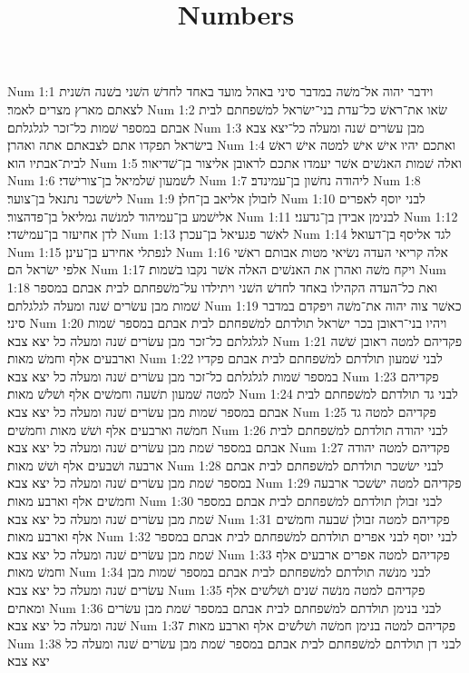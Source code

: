 

\title{Numbers}

Num 1:1  וידבר יהוה אל־משׁה במדבר סיני באהל מועד באחד לחדשׁ השׁני בשׁנה השׁנית לצאתם מארץ מצרים לאמר׃
Num 1:2  שׂאו את־ראשׁ כל־עדת בני־ישׂראל למשׁפחתם לבית אבתם במספר שׁמות כל־זכר לגלגלתם׃
Num 1:3  מבן עשׂרים שׁנה ומעלה כל־יצא צבא בישׂראל תפקדו אתם לצבאתם אתה ואהרן׃
Num 1:4  ואתכם יהיו אישׁ אישׁ למטה אישׁ ראשׁ לבית־אבתיו הוא׃
Num 1:5  ואלה שׁמות האנשׁים אשׁר יעמדו אתכם לראובן אליצור בן־שׁדיאור׃
Num 1:6  לשׁמעון שׁלמיאל בן־צורישׁדי׃
Num 1:7  ליהודה נחשׁון בן־עמינדב׃
Num 1:8  לישׂשכר נתנאל בן־צוער׃
Num 1:9  לזבולן אליאב בן־חלן׃
Num 1:10  לבני יוסף לאפרים אלישׁמע בן־עמיהוד למנשׁה גמליאל בן־פדהצור׃
Num 1:11  לבנימן אבידן בן־גדעני׃
Num 1:12  לדן אחיעזר בן־עמישׁדי׃
Num 1:13  לאשׁר פגעיאל בן־עכרן׃
Num 1:14  לגד אליסף בן־דעואל׃
Num 1:15  לנפתלי אחירע בן־עינן׃
Num 1:16  אלה קריאי העדה נשׂיאי מטות אבותם ראשׁי אלפי ישׂראל הם׃
Num 1:17  ויקח משׁה ואהרן את האנשׁים האלה אשׁר נקבו בשׁמות׃
Num 1:18  ואת כל־העדה הקהילו באחד לחדשׁ השׁני ויתילדו על־משׁפחתם לבית אבתם במספר שׁמות מבן עשׂרים שׁנה ומעלה לגלגלתם׃
Num 1:19  כאשׁר צוה יהוה את־משׁה ויפקדם במדבר סיני׃
Num 1:20  ויהיו בני־ראובן בכר ישׂראל תולדתם למשׁפחתם לבית אבתם במספר שׁמות לגלגלתם כל־זכר מבן עשׂרים שׁנה ומעלה כל יצא צבא׃
Num 1:21  פקדיהם למטה ראובן שׁשׁה וארבעים אלף וחמשׁ מאות׃
Num 1:22  לבני שׁמעון תולדתם למשׁפחתם לבית אבתם פקדיו במספר שׁמות לגלגלתם כל־זכר מבן עשׂרים שׁנה ומעלה כל יצא צבא׃
Num 1:23  פקדיהם למטה שׁמעון תשׁעה וחמשׁים אלף ושׁלשׁ מאות׃
Num 1:24  לבני גד תולדתם למשׁפחתם לבית אבתם במספר שׁמות מבן עשׂרים שׁנה ומעלה כל יצא צבא׃
Num 1:25  פקדיהם למטה גד חמשׁה וארבעים אלף ושׁשׁ מאות וחמשׁים׃
Num 1:26  לבני יהודה תולדתם למשׁפחתם לבית אבתם במספר שׁמת מבן עשׂרים שׁנה ומעלה כל יצא צבא׃
Num 1:27  פקדיהם למטה יהודה ארבעה ושׁבעים אלף ושׁשׁ מאות׃
Num 1:28  לבני ישׂשכר תולדתם למשׁפחתם לבית אבתם במספר שׁמת מבן עשׂרים שׁנה ומעלה כל יצא צבא׃
Num 1:29  פקדיהם למטה ישׂשכר ארבעה וחמשׁים אלף וארבע מאות׃
Num 1:30  לבני זבולן תולדתם למשׁפחתם לבית אבתם במספר שׁמת מבן עשׂרים שׁנה ומעלה כל יצא צבא׃
Num 1:31  פקדיהם למטה זבולן שׁבעה וחמשׁים אלף וארבע מאות׃
Num 1:32  לבני יוסף לבני אפרים תולדתם למשׁפחתם לבית אבתם במספר שׁמת מבן עשׂרים שׁנה ומעלה כל יצא צבא׃
Num 1:33  פקדיהם למטה אפרים ארבעים אלף וחמשׁ מאות׃
Num 1:34  לבני מנשׁה תולדתם למשׁפחתם לבית אבתם במספר שׁמות מבן עשׂרים שׁנה ומעלה כל יצא צבא׃
Num 1:35  פקדיהם למטה מנשׁה שׁנים ושׁלשׁים אלף ומאתים׃
Num 1:36  לבני בנימן תולדתם למשׁפחתם לבית אבתם במספר שׁמת מבן עשׂרים שׁנה ומעלה כל יצא צבא׃
Num 1:37  פקדיהם למטה בנימן חמשׁה ושׁלשׁים אלף וארבע מאות׃
Num 1:38  לבני דן תולדתם למשׁפחתם לבית אבתם במספר שׁמת מבן עשׂרים שׁנה ומעלה כל יצא צבא׃
